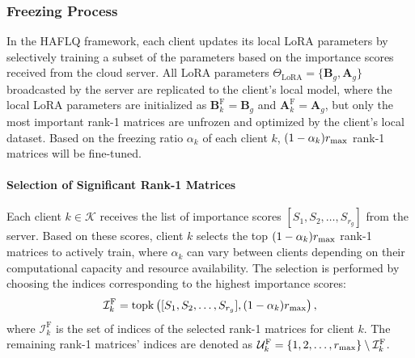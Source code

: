 \documentclass[journal]{IEEEtran}
\begin{document}
\subsubsection{Freezing Process}
In the HAFLQ framework, each client updates its local LoRA parameters by selectively training a subset of the parameters based on the importance scores received from the cloud server. All LoRA parameters \(\Theta_{\text{LoRA}} = \{\mathbf{B}_g, \mathbf{A}_g\}\) broadcasted by the server are replicated to the client's local model, where the local LoRA parameters are initialized as \(\mathbf{B}_k^{\text{F}} = \mathbf{B}_g\) and \(\mathbf{A}_k^{\text{F}} = \mathbf{A}_g\), but only the most important rank-1 matrices are unfrozen and optimized by the client's local dataset. 
Based on the freezing ratio $\alpha_k$ of each client $k$, $(1-\alpha_k)r_{\rm max}$ rank-1 matrices will be fine-tuned.

\paragraph{Selection of Significant Rank-1 Matrices}
Each client \(k \in \mathcal{K}\) receives the list of importance scores \([S_1, S_2, \ldots, S_{r_g}]\) from the server. Based on these scores, client \(k\) selects the top \((1-\alpha_k)r_{\rm max}\) rank-1 matrices to actively train, where \(\alpha_k\) can vary between clients depending on their computational capacity and resource availability. The selection is performed by choosing the indices corresponding to the highest importance scores:
\begin{equation}
\label{Ik_2}
\mathcal{I}_k^{\text{F}} = \text{topk}\left([S_1, S_2, \ldots, S_{r_g}], (1-\alpha_k)r_{\rm max}\right),
\end{equation}
where $\mathcal{I}_k^{\text{F}}$ is the set of indices of the selected rank-1 matrices for client $k$.
The remaining rank-1 matrices' indices are denoted as \(\mathcal{U}_k^{\text{F}} = \{1, 2, \ldots, r_{\rm max}\} \setminus \mathcal{I}_k^{\text{F}}\).
\end{document}
